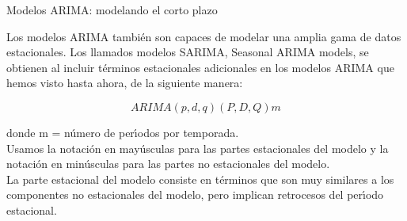 \documentclass[spanish,xcolor=table]{beamer}
\begin{document}
\begin{section}{Modelos ARIMA: modelando el corto plazo}
\begin{frame}
Los modelos ARIMA tambi\'en son capaces de modelar una amplia gama de datos estacionales. Los llamados  modelos SARIMA, Seasonal ARIMA models, se obtienen al incluir t\'erminos estacionales adicionales en los modelos ARIMA que hemos visto hasta ahora, de la siguiente manera:

\begin{equation}
ARIMA (p,d,q)(P,D,Q)m
\end{equation}

donde m = n\'umero de per\'{\i}odos por temporada. \\
Usamos la notaci\'on en may\'usculas para las partes estacionales del modelo y la notaci\'on en min\'usculas para las partes no estacionales del modelo.\\
La parte estacional del modelo consiste en t\'erminos que son muy similares a los componentes no estacionales del modelo, pero implican retrocesos del per\'{\i}odo estacional. \\

\end{frame}
\end{section}
\end{document}

